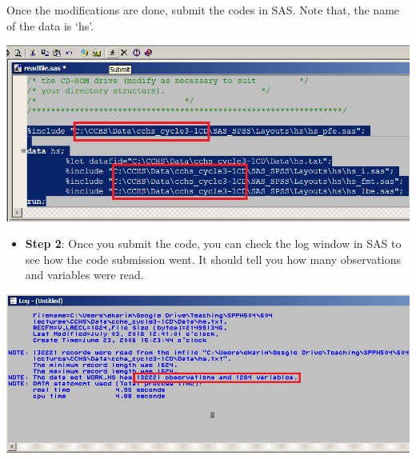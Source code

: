 \documentclass[
]{book}
\newenvironment{Shaded}{\begin{snugshade}}{\end{snugshade}}
\newcommand{\NormalTok}[1]{#1}
\newcommand{\StringTok}[1]{\textcolor[rgb]{0.31,0.60,0.02}{#1}}
\providecommand{\tightlist}{%
  \setlength{\itemsep}{0pt}\setlength{\parskip}{0pt}}
\begin{document}
\begin{Shaded}
\end{Shaded}

Once the modifications are done, submit the codes in SAS. Note that, the name of the data is `hs'.

\includegraphics[width=0.65\linewidth]{images/abacus14}

\begin{itemize}
\tightlist
\item
  \textbf{Step 2}: Once you submit the code, you can check the log window in SAS to see how the code submission went. It should tell you how many observations and variables were read.
\end{itemize}

\includegraphics[width=0.65\linewidth]{images/abacus15}
\end{document}
